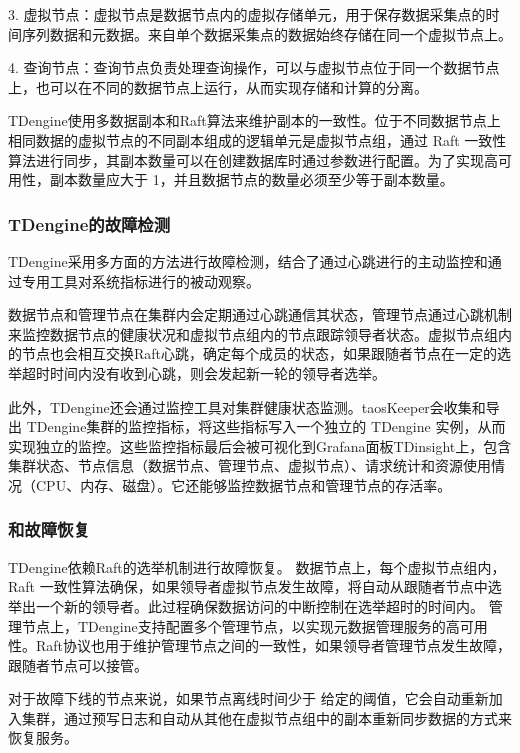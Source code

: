 3. 虚拟节点：虚拟节点是数据节点内的虚拟存储单元，用于保存数据采集点的时间序列数据和元数据。来自单个数据采集点的数据始终存储在同一个虚拟节点上。

4. 查询节点：查询节点负责处理查询操作，可以与虚拟节点位于同一个数据节点上，也可以在不同的数据节点上运行，从而实现存储和计算的分离。

TDengine使用多数据副本和Raft算法来维护副本的一致性。位于不同数据节点上相同数据的虚拟节点的不同副本组成的逻辑单元是虚拟节点组，通过 Raft 一致性算法进行同步，其副本数量可以在创建数据库时通过参数进行配置。为了实现高可用性，副本数量应大于 1，并且数据节点的数量必须至少等于副本数量。 


\subsubsection{TDengine的故障检测}

TDengine采用多方面的方法进行故障检测，结合了通过心跳进行的主动监控和通过专用工具对系统指标进行的被动观察。

数据节点和管理节点在集群内会定期通过心跳通信其状态，管理节点通过心跳机制来监控数据节点的健康状况和虚拟节点组内的节点跟踪领导者状态。虚拟节点组内的节点也会相互交换Raft心跳，确定每个成员的状态，如果跟随者节点在一定的选举超时时间内没有收到心跳，则会发起新一轮的领导者选举。

此外，TDengine还会通过监控工具对集群健康状态监测。taosKeeper会收集和导出 TDengine集群的监控指标，将这些指标写入一个独立的 TDengine 实例，从而实现独立的监控。这些监控指标最后会被可视化到Grafana面板TDinsight上，包含集群状态、节点信息（数据节点、管理节点、虚拟节点）、请求统计和资源使用情况（CPU、内存、磁盘）。它还能够监控数据节点和管理节点的存活率。


\subsubsection{\failover 和故障恢复}

TDengine依赖Raft的选举机制进行故障恢复。
数据节点上，每个虚拟节点组内，Raft 一致性算法确保，如果领导者虚拟节点发生故障，将自动从跟随者节点中选举出一个新的领导者。此过程确保数据访问的中断控制在选举超时的时间内。
管理节点上，TDengine支持配置多个管理节点，以实现元数据管理服务的高可用性。Raft协议也用于维护管理节点之间的一致性，如果领导者管理节点发生故障，跟随者节点可以接管。

对于故障下线的节点来说，如果节点离线时间少于 给定的阈值，它会自动重新加入集群，通过预写日志和自动从其他在虚拟节点组中的副本重新同步数据的方式来恢复服务。



